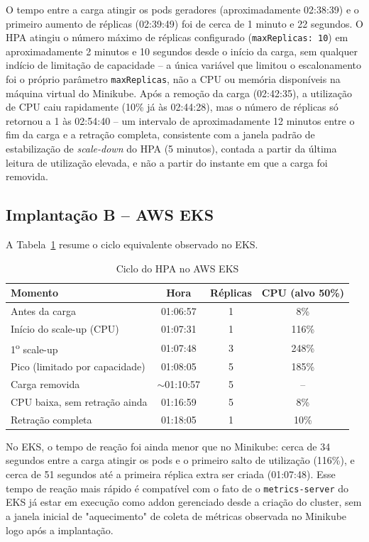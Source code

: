 \documentclass[12pt]{article}
\begin{document}
O tempo entre a carga atingir os pods geradores (aproximadamente 02:38:39)
e o primeiro aumento de réplicas (02:39:49) foi de cerca de 1 minuto e 22
segundos. O HPA atingiu o número máximo de réplicas configurado
(\texttt{maxReplicas: 10}) em aproximadamente 2 minutos e 10 segundos desde
o início da carga, sem qualquer indício de limitação de capacidade -- a
única variável que limitou o escalonamento foi o próprio parâmetro
\texttt{maxReplicas}, não a CPU ou memória disponíveis na máquina virtual do
Minikube. Após a remoção da carga (02:42:35), a utilização de CPU caiu
rapidamente (10\% já às 02:44:28), mas o número de réplicas só retornou a 1
às 02:54:40 -- um intervalo de aproximadamente 12 minutos entre o fim da
carga e a retração completa, consistente com a janela padrão de
estabilização de \emph{scale-down} do HPA (5 minutos), contada a partir da
última leitura de utilização elevada, e não a partir do instante em que a
carga foi removida.

\subsection{Implantação B -- AWS EKS}

A Tabela~\ref{tab:eks} resume o ciclo equivalente observado no EKS.

\begin{table}[ht]
\centering
\caption{Ciclo do HPA no AWS EKS}
\label{tab:eks}
\begin{tabular}{lccc}
\toprule
Momento & Hora & Réplicas & CPU (alvo 50\%) \\
\midrule
Antes da carga                 & 01:06:57 & 1 & 8\%   \\
Início do scale-up (CPU)       & 01:07:31 & 1 & 116\% \\
1\textsuperscript{o} scale-up             & 01:07:48 & 3 & 248\% \\
Pico (limitado por capacidade) & 01:08:05 & 5 & 185\% \\
Carga removida                 & $\sim$01:10:57 & 5 & --    \\
CPU baixa, sem retração ainda  & 01:16:59 & 5 & 8\%   \\
Retração completa              & 01:18:05 & 1 & 10\%  \\
\bottomrule
\end{tabular}
\end{table}

No EKS, o tempo de reação foi ainda menor que no Minikube: cerca de 34
segundos entre a carga atingir os pods e o primeiro salto de utilização
(116\%), e cerca de 51 segundos até a primeira réplica extra ser criada
(01:07:48). Esse tempo de reação mais rápido é compatível com o fato de o
\texttt{metrics-server} do EKS já estar em execução como addon gerenciado
desde a criação do cluster, sem a janela inicial de "aquecimento" de coleta
de métricas observada no Minikube logo após a implantação.
\end{document}
